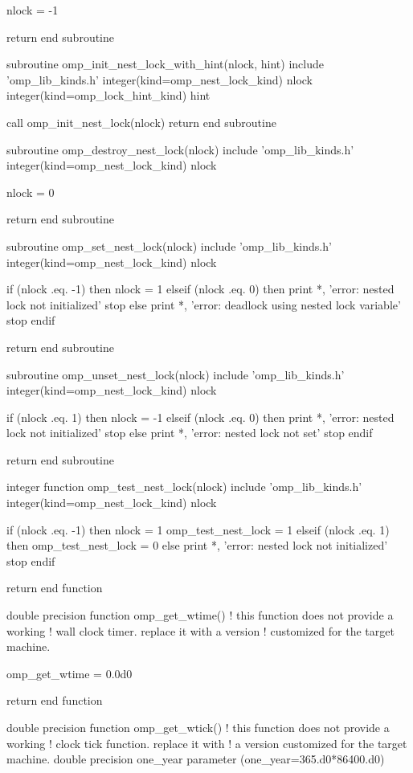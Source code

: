 {\begin{codepar}
  nlock = -1

  return
end subroutine

subroutine omp\_init\_nest\_lock\_with\_hint(nlock, hint)
  include 'omp\_lib\_kinds.h'
  integer(kind=omp\_nest\_lock\_kind) nlock
  integer(kind=omp\_lock\_hint\_kind) hint
  
  call omp\_init\_nest\_lock(nlock)
  return
end subroutine

subroutine omp\_destroy\_nest\_lock(nlock)
  include 'omp\_lib\_kinds.h'
  integer(kind=omp\_nest\_lock\_kind) nlock

  nlock = 0

  return
end subroutine

subroutine omp\_set\_nest\_lock(nlock)
  include 'omp\_lib\_kinds.h'
  integer(kind=omp\_nest\_lock\_kind) nlock

  if (nlock .eq. -1) then
    nlock = 1
  elseif (nlock .eq. 0) then
    print *, 'error: nested lock not initialized'
    stop
  else
    print *, 'error: deadlock using nested lock variable'
    stop
  endif

  return
end subroutine

subroutine omp\_unset\_nest\_lock(nlock)
  include 'omp\_lib\_kinds.h'
  integer(kind=omp\_nest\_lock\_kind) nlock

  if (nlock .eq. 1) then
    nlock = -1
  elseif (nlock .eq. 0) then
    print *, 'error: nested lock not initialized'
    stop
  else
    print *, 'error: nested lock not set'
    stop
  endif

  return
end subroutine

integer function omp\_test\_nest\_lock(nlock)
  include 'omp\_lib\_kinds.h'
  integer(kind=omp\_nest\_lock\_kind) nlock

  if (nlock .eq. -1) then
    nlock = 1
    omp\_test\_nest\_lock = 1
  elseif (nlock .eq. 1) then
    omp\_test\_nest\_lock = 0
  else
    print *, 'error: nested lock not initialized'
    stop
  endif

  return
end function

double precision function omp\_get\_wtime()
  ! this function does not provide a working
  ! wall clock timer. replace it with a version
  ! customized for the target machine.

  omp\_get\_wtime = 0.0d0

  return
end function

double precision function omp\_get\_wtick()
  ! this function does not provide a working
  ! clock tick function. replace it with
  ! a version customized for the target machine.
  double precision one\_year
  parameter (one\_year=365.d0*86400.d0)


\end{codepar}}
